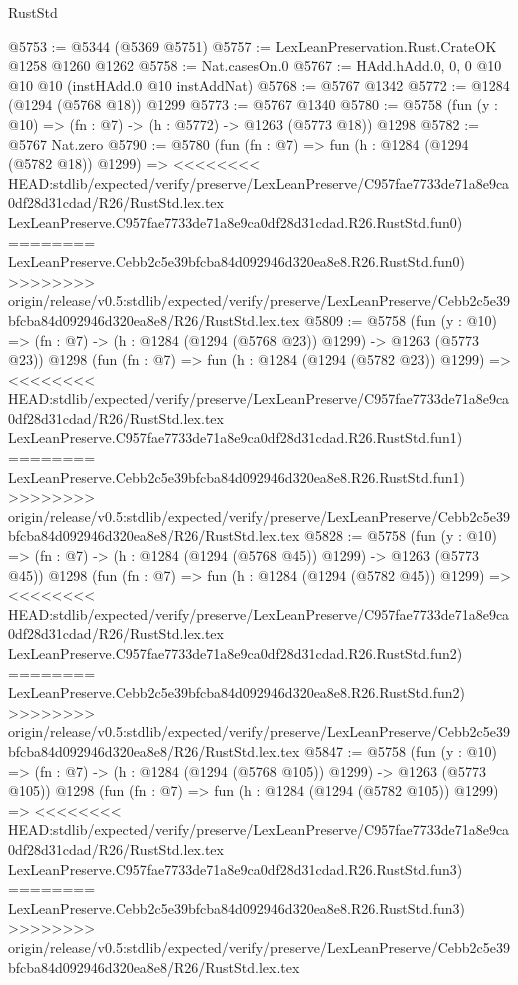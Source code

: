 \begin{lexlean}{RustStd}
\begin{coremodule}
{\begin{coremodule}
{{{{{{{{{{{{@5753 := @5344 (@5369 @5751)
@5757 := LexLeanPreservation.Rust.CrateOK @1258 @1260 @1262
@5758 := Nat.casesOn.{0}
@5767 := HAdd.hAdd.{0, 0, 0} @10 @10 @10 (instHAdd.{0} @10 instAddNat)
@5768 := @5767 @1342
@5772 := @1284 (@1294 (@5768 @18)) @1299
@5773 := @5767 @1340
@5780 := @5758 (fun (y : @10) => (fn : @7) -> (h : @5772) -> @1263 (@5773 @18)) @1298
@5782 := @5767 Nat.zero
@5790 := @5780
    (fun (fn : @7) =>
    fun (h : @1284 (@1294 (@5782 @18)) @1299) =>
<<<<<<<< HEAD:stdlib/expected/verify/preserve/LexLeanPreserve/C957fae7733de71a8e9ca0df28d31cdad/R26/RustStd.lex.tex
    LexLeanPreserve.C957fae7733de71a8e9ca0df28d31cdad.R26.RustStd.fun0)
========
    LexLeanPreserve.Cebb2c5e39bfcba84d092946d320ea8e8.R26.RustStd.fun0)
>>>>>>>> origin/release/v0.5:stdlib/expected/verify/preserve/LexLeanPreserve/Cebb2c5e39bfcba84d092946d320ea8e8/R26/RustStd.lex.tex
@5809 := @5758
    (fun (y : @10) => (fn : @7) -> (h : @1284 (@1294 (@5768 @23)) @1299) -> @1263 (@5773 @23))
    @1298
    (fun (fn : @7) =>
    fun (h : @1284 (@1294 (@5782 @23)) @1299) =>
<<<<<<<< HEAD:stdlib/expected/verify/preserve/LexLeanPreserve/C957fae7733de71a8e9ca0df28d31cdad/R26/RustStd.lex.tex
    LexLeanPreserve.C957fae7733de71a8e9ca0df28d31cdad.R26.RustStd.fun1)
========
    LexLeanPreserve.Cebb2c5e39bfcba84d092946d320ea8e8.R26.RustStd.fun1)
>>>>>>>> origin/release/v0.5:stdlib/expected/verify/preserve/LexLeanPreserve/Cebb2c5e39bfcba84d092946d320ea8e8/R26/RustStd.lex.tex
@5828 := @5758
    (fun (y : @10) => (fn : @7) -> (h : @1284 (@1294 (@5768 @45)) @1299) -> @1263 (@5773 @45))
    @1298
    (fun (fn : @7) =>
    fun (h : @1284 (@1294 (@5782 @45)) @1299) =>
<<<<<<<< HEAD:stdlib/expected/verify/preserve/LexLeanPreserve/C957fae7733de71a8e9ca0df28d31cdad/R26/RustStd.lex.tex
    LexLeanPreserve.C957fae7733de71a8e9ca0df28d31cdad.R26.RustStd.fun2)
========
    LexLeanPreserve.Cebb2c5e39bfcba84d092946d320ea8e8.R26.RustStd.fun2)
>>>>>>>> origin/release/v0.5:stdlib/expected/verify/preserve/LexLeanPreserve/Cebb2c5e39bfcba84d092946d320ea8e8/R26/RustStd.lex.tex
@5847 := @5758
    (fun (y : @10) => (fn : @7) -> (h : @1284 (@1294 (@5768 @105)) @1299) -> @1263 (@5773 @105))
    @1298
    (fun (fn : @7) =>
    fun (h : @1284 (@1294 (@5782 @105)) @1299) =>
<<<<<<<< HEAD:stdlib/expected/verify/preserve/LexLeanPreserve/C957fae7733de71a8e9ca0df28d31cdad/R26/RustStd.lex.tex
    LexLeanPreserve.C957fae7733de71a8e9ca0df28d31cdad.R26.RustStd.fun3)
========
    LexLeanPreserve.Cebb2c5e39bfcba84d092946d320ea8e8.R26.RustStd.fun3)
>>>>>>>> origin/release/v0.5:stdlib/expected/verify/preserve/LexLeanPreserve/Cebb2c5e39bfcba84d092946d320ea8e8/R26/RustStd.lex.tex
}}}}}}}}}}}}
\end{coremodule}}
\end{coremodule}
\end{lexlean}
